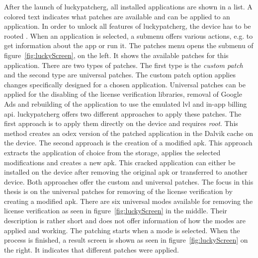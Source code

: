 After the launch of \gls{luckypatcherg}, all installed applications are shown in a list.
A colored text indicates what patches are available and can be applied to an application.
In order to unlock all features of \gls{luckypatcherg}, the device has to be rooted \cite{luckyPatcherOfficial}.
\newline
When an application is selected, a submenu offers various actions, e.g. to get information about the app or run it.
The patches menu opens the submenu of figure~\ref{fig:luckyScreen}, on the left.
It shows the available patches for this application.
\newline
There are two types of patches.
The first type is the \textit{custom patch} and the second type are universal patches.
The custom patch option applies changes specifically designed for a chosen application.
\newline
Universal patches can be applied for the disabling of the license verification libraries, removal of Google Ads and rebuilding of the application to use the emulated \gls{lvl} and in-app billing \gls{api}.
\newline
\gls{luckypatcherg} offers two different approaches to apply these patches.
The first approach is to apply them directly on the device and requires \textit{root}.
This method creates an \gls{odex} version of the patched application in the Dalvik cache on the device.
The second approach is the creation of a modified \gls{apk}.
This approach extracts the application of choice from the storage, applies the selected modifications and creates a new \gls{apk}.
This cracked application can either be installed on the device after removing the original \gls{apk} or transferred to another device.
\newline
Both approaches offer the custom and universal patches.
\newline
\newline
The focus in this thesis is on the universal patches for removing of the license verification by creating a modified \gls{apk}.
\newline
There are six universal modes available for removing the license verification as seen in figure~\ref{fig:luckyScreen} in the middle.
Their description is rather short and does not offer information of how the modes are applied and working.
\newline
The patching starts when a mode is selected.
When the process is finished, a result screen is shown as seen in figure~\ref{fig:luckyScreen} on the right.
It indicates that different patches were applied.

